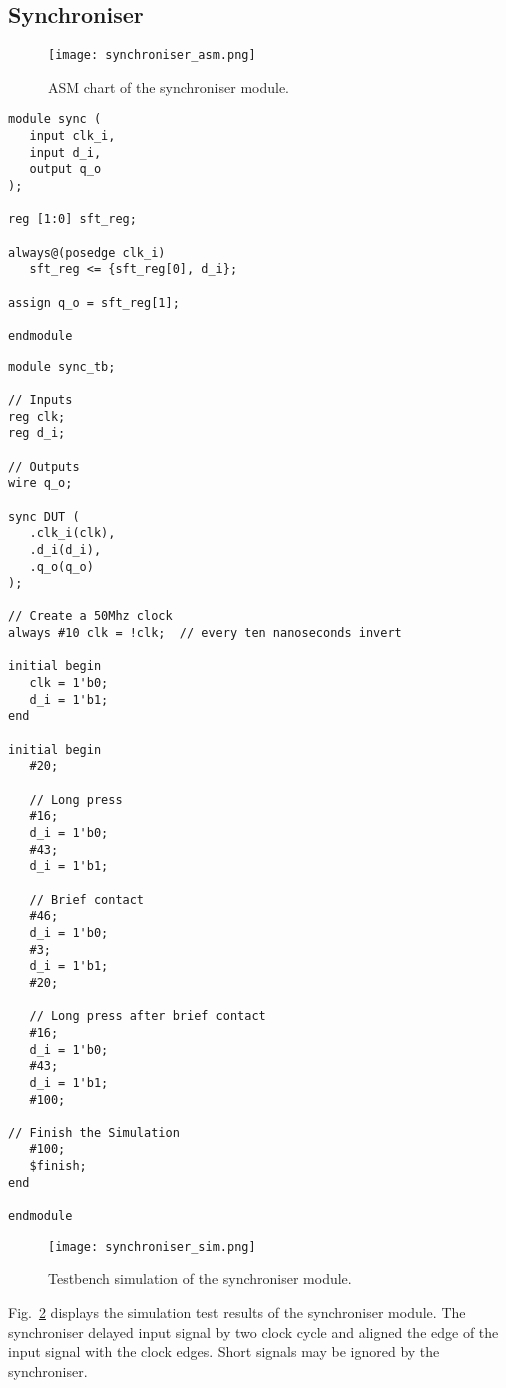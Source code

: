\subsection{Synchroniser}

\begin{figure}[htbp]
   \centering
   \texttt{[image: synchroniser\_asm.png]}
   \caption{ASM chart of the synchroniser module.}
   \label{fig:synchroniser_asm}
\end{figure}

\begin{verbatim}
module sync (
   input clk_i,
   input d_i,
   output q_o
);

reg [1:0] sft_reg;

always@(posedge clk_i)
   sft_reg <= {sft_reg[0], d_i};

assign q_o = sft_reg[1];

endmodule
\end{verbatim}

\begin{verbatim}
module sync_tb;

// Inputs
reg clk;
reg d_i;

// Outputs
wire q_o;

sync DUT (
   .clk_i(clk),
   .d_i(d_i),
   .q_o(q_o)
);

// Create a 50Mhz clock
always #10 clk = !clk;  // every ten nanoseconds invert

initial begin
   clk = 1'b0;
   d_i = 1'b1;
end

initial begin
   #20;

   // Long press
   #16;
   d_i = 1'b0;
   #43;
   d_i = 1'b1;

   // Brief contact
   #46;
   d_i = 1'b0;
   #3;
   d_i = 1'b1;
   #20;

   // Long press after brief contact
   #16;
   d_i = 1'b0;
   #43;
   d_i = 1'b1;
   #100;

// Finish the Simulation
   #100;
   $finish;
end

endmodule
\end{verbatim}

\begin{figure}[htbp]
   \centering
   \texttt{[image: synchroniser\_sim.png]}
   \caption{Testbench simulation of the synchroniser module.}
   \label{fig:synchroniser_sim}
\end{figure}

Fig.~\ref{fig:synchroniser_sim} displays the simulation test results of the synchroniser module. The synchroniser delayed input signal by two clock cycle and aligned the edge of the input signal with the clock edges. Short signals may be ignored by the synchroniser.
